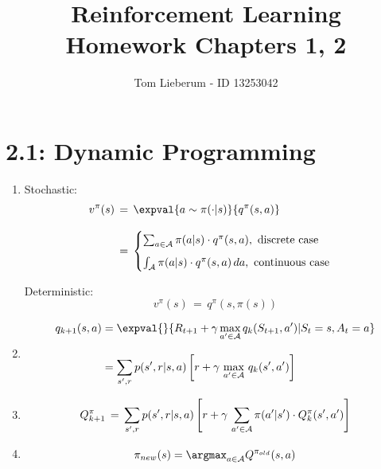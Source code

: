 \documentclass{article}
\title{Reinforcement Learning \\[3mm] Homework Chapters 1, 2}
\author{Tom Lieberum - ID 13253042}
\begin{document}
\date{}
\maketitle


\section*{2.1: Dynamic Programming}

\begin{enumerate}[label*=\arabic*.]

\item

Stochastic:
\begin{align*}
v^\pi(s) \,&=\, \expval{a\sim\pi(\cdot|s)}{q^\pi(s,a)}\\[3mm]
\,&=\, 
\begin{cases}
\sum_{a\in\cal A}\pi(a|s) \cdot q^\pi(s,a), \,\, \text{discrete case}\\[2mm]
\int_{\cal A}\pi(a|s) \cdot q^\pi(s,a) \,da, \,\, \text{continuous case}
\end{cases}
\end{align*}


\noindent Deterministic:
\[
v^\pi(s) \,=\,  q^\pi(s,\pi(s))
\]

\item
\begin{align*}
q_{k+1}(s,a) &= \expval{}{R_{t+1} + \gamma \max_{a'\in\cal A} {q_k(S_{t+1},a')} | S_t=s, A_t=a}\\[3mm]
&= \sum_{s',r} p(s',r|s,a)\left[ r + \gamma\, \max_{a' \in \cal A}\,q_{k}(s',a') \right]
\end{align*}


\item
\[
Q^\pi_{k+1} \,=\, \sum_{s',r}p(s',r|s,a) \left[ r + \gamma\, \sum_{a'\in\cal A} \pi(a'|s')\cdot Q^\pi_{k}(s',a') \right]
\]

\item
\[
\pi_{new}(s) = \argmax_{a\in \cal A}Q^{\pi_{old}}(s,a)
\]

\end{enumerate}
\end{document}
